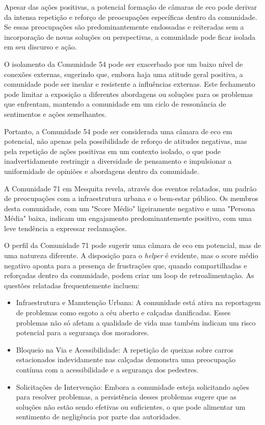 Apesar das ações positivas, a potencial formação de câmaras de eco pode derivar da intensa repetição e reforço de preocupações específicas dentro da comunidade. Se essas preocupações são predominantemente endossadas e reiteradas sem a incorporação de novas soluções ou perspectivas, a comunidade pode ficar isolada em seu discurso e ação.

O isolamento da Comunidade 54 pode ser exacerbado por um baixo nível de conexões externas, sugerindo que, embora haja uma atitude geral positiva, a comunidade pode ser insular e resistente a influências externas. Este fechamento pode limitar a exposição a diferentes abordagens ou soluções para os problemas que enfrentam, mantendo a comunidade em um ciclo de ressonância de sentimentos e ações semelhantes.

Portanto, a Comunidade 54 pode ser considerada uma câmara de eco em potencial, não apenas pela possibilidade de reforço de atitudes negativas, mas pela repetição de ações positivas em um contexto isolado, o que pode inadvertidamente restringir a diversidade de pensamento e impulsionar a uniformidade de opiniões e abordagens dentro da comunidade.

A Comunidade 71 em Mesquita revela, através dos eventos relatados, um padrão de preocupações com a infraestrutura urbana e o bem-estar público. Os membros desta comunidade, com um "Score Médio" ligeiramente negativo e uma "Persona Média" baixa, indicam um engajamento predominantemente positivo, com uma leve tendência a expressar reclamações.

O perfil da Comunidade 71 pode sugerir uma câmara de eco em potencial, mas de uma natureza diferente. A disposição para o \textit{helper} é evidente, mas o score médio negativo aponta para a presença de frustrações que, quando compartilhadas e reforçadas dentro da comunidade, podem criar um loop de retroalimentação. As questões relatadas frequentemente incluem:

\begin{itemize}
	\item Infraestrutura e Manutenção Urbana: A comunidade está ativa na reportagem de problemas como esgoto a céu aberto e calçadas danificadas. Esses problemas não só afetam a qualidade de vida mas também indicam um risco potencial para a segurança dos moradores.
	\item Bloqueio na Via e Acessibilidade: A repetição de queixas sobre carros estacionados indevidamente nas calçadas demonstra uma preocupação contínua com a acessibilidade e a segurança dos pedestres.
	\item Solicitações de Intervenção: Embora a comunidade esteja solicitando ações para resolver problemas, a persistência desses problemas sugere que as soluções não estão sendo efetivas ou suficientes, o que pode alimentar um sentimento de negligência por parte das autoridades.
\end{itemize}

